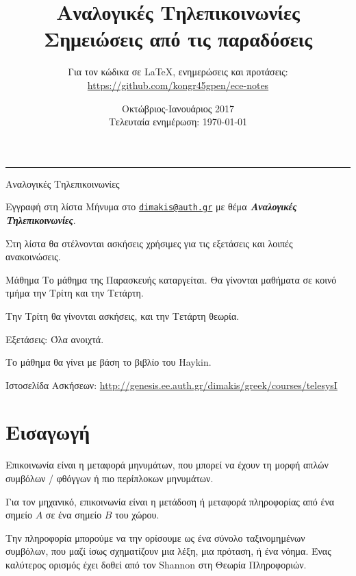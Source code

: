\documentclass[11pt,a4paper,notitlepage,fleqn]{article}
\title{Αναλογικές Τηλεπικοινωνίες
	\\
	{ 
		\normalsize Σημειώσεις από τις παραδόσεις
	}}
\date{Οκτώβριος-Ιανουάριος 2017
	\\
	{ 
		\small Τελευταία ενημέρωση: \today
	}
}
\author{
	Για τον κώδικα σε \LaTeX, ενημερώσεις και προτάσεις:
	\\
	\url{https://github.com/kongr45gpen/ece-notes}}
\begin{document}
\maketitle

\hrule
\vspace{50pt}
	
Αναλογικές Τηλεπικοινωνίες

\begin{attnbox}{Εγγραφή στη λίστα}
	Μήνυμα στο \href{mailto:dimakis@auth.gr}{\texttt{dimakis@auth.gr}} με θέμα
	\textit{\textbf{Αναλογικές Τηλεπικοινωνίες}}.
	
	\tcblower
	
	Στη λίστα θα στέλνονται ασκήσεις χρήσιμες για τις εξετάσεις και λοιπές ανακοινώσεις.
\end{attnbox}

\begin{attnbox}{Μάθημα}
	Το μάθημα της Παρασκευής καταργείται.
	Θα γίνονται μαθήματα σε κοινό τμήμα την Τρίτη και την Τετάρτη.
	
	Την Τρίτη θα γίνονται ασκήσεις, και την Τετάρτη θεωρία.
\end{attnbox}

Εξετάσεις: Όλα ανοιχτά.

Το μάθημα θα γίνει με βάση το βιβλίο του Haykin.

Ιστοσελίδα Ασκήσεων:
\url{http://genesis.ee.auth.gr/dimakis/greek/courses/telesysI}

\section{Εισαγωγή}
Επικοινωνία είναι η μεταφορά μηνυμάτων, που μπορεί να έχουν τη μορφή απλών συμβόλων / φθόγγων
ή πιο περίπλοκων μηνυμάτων.

Για τον μηχανικό, επικοινωνία είναι η μετάδοση ή μεταφορά πληροφορίας από ένα σημείο \( A \) σε ένα σημείο \( B \) του χώρου.

\begin{center}
\end{center}

Την πληροφορία μπορούμε να την ορίσουμε ως ένα σύνολο ταξινομημένων συμβόλων, που μαζί ίσως
σχηματίζουν μια λέξη, μια πρόταση, ή ένα νόημα. Ένας καλύτερος ορισμός έχει δοθεί από τον
Shannon στη Θεωρία Πληροφοριών.
\end{document}

